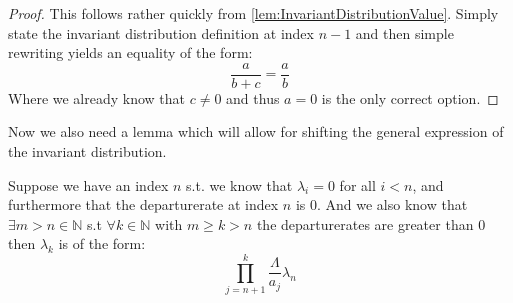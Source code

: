 \begin{proof}
  This follows rather quickly from \ref{lem:InvariantDistributionValue}. Simply state the invariant distribution
  definition at index $n-1$ and then simple rewriting yields an equality of the form:
  $$\frac{a}{b+c} = \frac{a}{b}$$
  Where we already know that $c\neq0$ and thus $a=0$ is the only correct option.
\end{proof}






Now we also need a lemma which will allow for shifting the general expression of the invariant distribution.
\begin{lemma}\label{lem:ShiftedInvariantDistributionValue}\leanok
  Suppose we have an index $n$ s.t. we know that $\lambda_i = 0$ for all $i < n$, and furthermore
  that the departurerate at index $n$ is $0$. And we also know that $\exists m > n \in \mathbb{N}$ s.t
  $\forall k \in \mathbb{N}$ with $m \geq k > n$
  the departurerates are greater than $0$ then $\lambda_k$ is of the form:
  $$\prod_{j={n+1}}^k \frac{\Lambda}{a_j} \lambda_n$$
\end{lemma}

